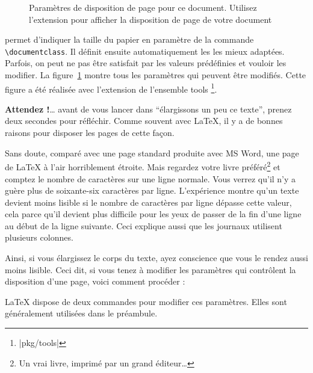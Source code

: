 \begin{figure}[!hp]
\begin{center}
\makeatletter\@mylayout\makeatother
\end{center}
\vspace*{1.8cm}
\caption[Paramètres de disposition de page pour ce document]{Paramètres de disposition de page pour ce document. Utilisez l'extension  pour afficher la disposition de page de votre document}
\label{fig:layout}
\end{figure}
\LaTeXe{} permet d'indiquer la taille du papier en paramètre de  la commande
\verb|\documentclass|. Il définit ensuite automatiquement les
 les mieux adaptées. Parfois, on peut ne pas être satisfait par les
valeurs prédéfinies et vouloir les modifier.
\thispagestyle{fancyplain}
La figure~\ref{fig:layout} montre tous les paramètres qui peuvent être
modifiés. Cette figure a été réalisée avec l'extension  de
l'ensemble tools
\footnote{\CTANref|pkg/tools|}.

\textbf{Attendez !}\dots{} avant de vous lancer dans \enquote{élargissons un peu
ce texte}, prenez deux secondes pour réfléchir. Comme souvent avec
\LaTeX{}, il y a de bonnes raisons pour disposer les pages de cette
façon.

Sans doute, comparé avec une page standard produite avec MS Word, une page de
\LaTeX{} à l'air horriblement étroite. Mais regardez votre livre
préféré\footnote{Un vrai livre, imprimé par un grand éditeur\dots} et
comptez le nombre de caractères sur une ligne normale. Vous verrez
qu'il n'y a guère plus de soixante-six caractères par
ligne. L'expérience montre qu'un texte devient moins lisible si le
nombre de caractères par ligne dépasse cette valeur, cela parce qu'il
devient plus difficile pour les yeux de passer de la fin d'une ligne
au début de la ligne suivante. Ceci explique aussi que les journaux
utilisent plusieurs colonnes.

Ainsi, si vous élargissez le corps du texte, ayez conscience que vous
le rendez aussi moins lisible. Ceci dit, si vous tenez à modifier les
paramètres qui contrôlent la
disposition d'une page, voici comment procéder :

\LaTeX{} dispose de deux commandes pour modifier ces paramètres. Elles
sont généralement utilisées dans le préambule.

